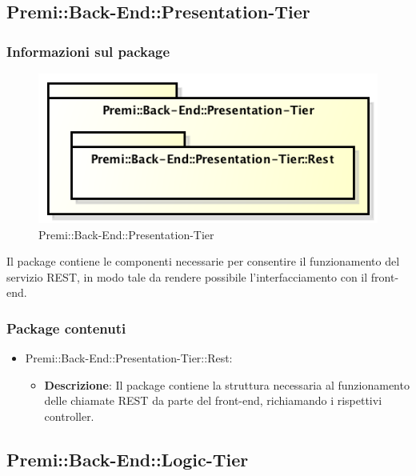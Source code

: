 \newpage

\subsection{Premi::Back-End::Presentation-Tier}
	\subsubsection*{Informazioni sul package}
		\begin{figure}[h]
			\centering
			\includegraphics[width=0.5\linewidth]{img/back-end_presentation-tier}
			\caption[Premi::Back-End::Presentation-Tier]{Premi::Back-End::Presentation-Tier}
		\end{figure}
		Il package contiene le componenti necessarie per consentire il funzionamento del servizio \gls{REST}, in modo tale da rendere possibile l'interfacciamento con il \gls{front-end}.
		
	\subsubsection*{Package contenuti}
		\begin{itemize}
			\item Premi::Back-End::Presentation-Tier::Rest:
			\begin{itemize}
				\item \textbf{Descrizione}: Il package contiene la struttura necessaria al funzionamento delle chiamate \gls{REST} da parte del \gls{front-end}, richiamando i rispettivi controller.
			\end{itemize}
		\end{itemize}
		
\newpage
		
\subsection{Premi::Back-End::Logic-Tier}
